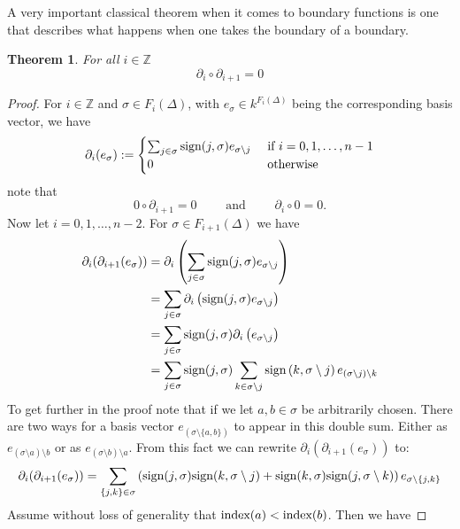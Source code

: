 \documentclass[11pt,a4paper,twoside]{report}
\newtheorem{mythm}{Theorem}[chapter]
\begin{document}
A very important classical theorem when it comes to boundary functions is one that describes what happens when one takes the boundary of a boundary.
\begin{mythm}\label{thm:boundary}
For all $i\in\mathbb{Z}$ 
\begin{equation*}
\partial_i\circ\partial_{i+1}=0
\end{equation*}
\end{mythm}
\begin{proof}
For $i\in\mathbb{Z}$ and $\sigma\in F_i(\Delta)$, with $e_\sigma\in k^{F_i(\Delta)}$ being the corresponding basis vector, we have 
\begin{equation*}
\partial_i(e_\sigma):=
\begin{cases}
\sum_{j\in\sigma}\textnormal{sign}(j,\sigma)e_{\sigma\setminus j} & \textnormal{ if } i=0,1,\dots,n-1 \\
0 & \textnormal{ otherwise}
\end{cases}
\end{equation*}
note that 
\begin{equation*}
0\circ\partial_{i+1}=0 \qquad \text{ and } \qquad \partial_i\circ 0 = 0.
\end{equation*}
Now let $i=0,1,\dots,n-2$. For $\sigma\in F_{i+1}(\Delta)$ we have
\begin{align*}
\partial_i(\partial_{i+1}(e_\sigma))&=\partial_i\left(\sum_{j\in\sigma}\textnormal{sign}(j,\sigma)e_{\sigma\setminus j}\right) \\
&=\sum_{j\in\sigma}\partial_i\left(\textnormal{sign}(j,\sigma)e_{\sigma\setminus j}\right)\\
&=\sum_{j\in\sigma}\textnormal{sign}(j,\sigma)\partial_i\left(e_{\sigma\setminus j}\right)\\
&=\sum_{j\in\sigma}\textnormal{sign}(j,\sigma)\sum_{k\in\sigma\setminus j}\textnormal{sign}\left(k,\sigma\setminus j\right)e_{(\sigma\setminus j)\setminus k}\\
\end{align*}
To get further in the proof note that if we let $a,b\in\sigma$ be arbitrarily chosen. There are two ways for a basis vector $e_{\left(\sigma\setminus\{a,b\}\right)}$ to appear in this double sum. Either as $e_{(\sigma\setminus a)\setminus b}$ or as $e_{(\sigma\setminus b)\setminus a}$. From this fact we can rewrite $\partial_i(\partial_{i+1}(e_\sigma))$ to:
\begin{equation}
\partial_i(\partial_{i+1}(e_\sigma))=\sum_{\{j,k\}\in\sigma}\left(\textnormal{sign}(j,\sigma)\textnormal{sign}(k,\sigma\setminus j) + \textnormal{sign}(k,\sigma)\textnormal{sign}(j,\sigma\setminus k)\right)e_{\sigma\setminus\{j,k\}} \label{eq_boundary: 0}
\end{equation}
Assume without loss of generality that $\textnormal{index}(a)<\textnormal{index}(b)$. Then we have 


\end{proof}
\end{document}
